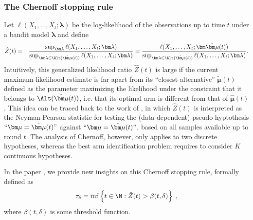 \documentclass[proc]{edpsmath}
\begin{document}
	\subsubsection{The Chernoff stopping rule}
	Let $\ell(X_1,\dots,X_t ; \bm\lambda)$ be the log-likelihood of the observations up to time $t$ under a bandit model $\bm\lambda$ and define 
	\begin{eqnarray}
	\hat{Z}(t) & = & \frac{\sup_{\bm \lambda}\ell(X_1,\dots,X_t ; \bm \lambda)}{\sup_{\bm \lambda \in \Alt(\hat{\bm \mu}(t))} \ell(X_1,\dots,X_t ; \bm \lambda)} = \frac{\ell(X_1,\dots,X_t ; \bm \hat{\bm\mu}(t))}{\sup_{\bm \lambda \in \Alt(\hat{\bm \mu}(t))} \ell(X_1,\dots,X_t ; \bm \lambda)}.
	\nonumber\end{eqnarray} 
	Intuitively, this generalized likelihood ratio $\hat{Z}(t)$ is large if the current maximum-likelihood estimate is far apart from its ``closest alternative'' $\tilde{\bm\mu}(t)$ defined as the parameter maximizing the likelihood under the constraint that it belongs to $\Alt(\hat{\bm\mu}(t))$, i.e. that its optimal arm is different from that of $\hat{\bm\mu}(t)$. This idea can be traced back to the work of \cite{Chernoff59}, in which $\hat{Z}(t)$ is interpreted as the Neyman-Pearson statistic for testing the (data-dependent) pseudo-hyptothesis $``\bm \mu = \hat{\bm\mu}(t)"$ against $``\bm \mu = \tilde{\bm \mu}(t)"$, based on all samples available up to round $t$. The analysis of Chernoff, however, only applies to two discrete hypotheses, whereas the best arm identification problem requires to consider $K$ continuous hypotheses.
	
	In the paper \cite{GK16}, we provide new insights on this Chernoff stopping rule, formally defined as 
	\begin{equation}\tau_{\delta} = \inf \left\{ t \in \N : \hat{Z}(t) > \beta(t,\delta) \right\}\;,\label{def:Stopping}\end{equation}
	where $\beta(t,\delta)$ is some threshold function. 
	
\end{document}
